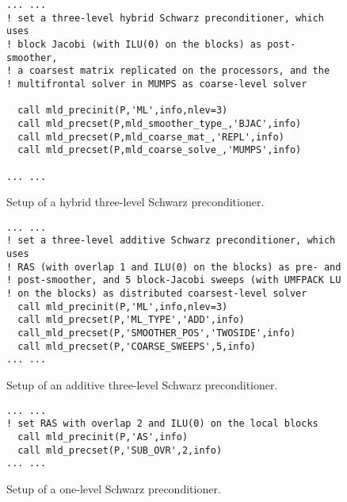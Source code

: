 \begin{figure}[tbh]
\begin{center}
\begin{minipage}{.90\textwidth} 
{\small
\begin{verbatim}
... ...
! set a three-level hybrid Schwarz preconditioner, which uses
! block Jacobi (with ILU(0) on the blocks) as post-smoother,
! a coarsest matrix replicated on the processors, and the
! multifrontal solver in MUMPS as coarse-level solver

  call mld_precinit(P,'ML',info,nlev=3)
  call mld_precset(P,mld_smoother_type_,'BJAC',info)
  call mld_precset(P,mld_coarse_mat_,'REPL',info)
  call mld_precset(P,mld_coarse_solve_,'MUMPS',info)

... ...
\end{verbatim}
}
\end{minipage}

\caption{Setup of a hybrid three-level Schwarz preconditioner.\label{fig:ex_3lhm}}
\end{center}
\end{figure}


\begin{figure}[tbh]
\begin{center}
\begin{minipage}{.90\textwidth} 
{\small
\begin{verbatim}
... ...
! set a three-level additive Schwarz preconditioner, which uses 
! RAS (with overlap 1 and ILU(0) on the blocks) as pre- and 
! post-smoother, and 5 block-Jacobi sweeps (with UMFPACK LU
! on the blocks) as distributed coarsest-level solver
  call mld_precinit(P,'ML',info,nlev=3)
  call mld_precset(P,'ML_TYPE','ADD',info)
  call_mld_precset(P,'SMOOTHER_POS','TWOSIDE',info)
  call mld_precset(P,'COARSE_SWEEPS',5,info)
... ...
\end{verbatim}
}
\end{minipage}

\caption{Setup of an additive three-level Schwarz preconditioner.\label{fig:ex_3la}}
\end{center}
\end{figure}

\begin{figure}[tbh]
\begin{center}
\begin{minipage}{.90\textwidth} 
{\small
\begin{verbatim}
... ...
! set RAS with overlap 2 and ILU(0) on the local blocks
  call mld_precinit(P,'AS',info)
  call mld_precset(P,'SUB_OVR',2,info)
... ...
\end{verbatim}
}
\end{minipage}
\caption{Setup of a one-level Schwarz preconditioner.\label{fig:ex_1l}}
\end{center}
\end{figure}


